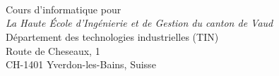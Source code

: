 \begin{titlingpage}
\heiglogo[color=black]
\vspace{6cm}
\vfil
\begin{center}
    {\huge\bfseries \booktitle\\}
    \vspace{1.5cm}
    {\Large\bfseries \bookauthor}\\[5pt]
    \bookemail\\[14pt]
    \vspace{2cm}
    {Cours d'informatique pour}\\[5pt]
    \emph{{La Haute École d'Ingénierie et de Gestion du canton de Vaud}}\\[2cm]
    \vfill
    {Département des technologies industrielles (TIN)}\\[5pt]
    {Route de Cheseaux, 1}\\[5pt]
    {CH-1401 Yverdon-les-Bains, Suisse}\\
    \vfill
    {\bookdate}
\end{center}
\end{titlingpage}
